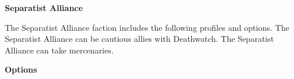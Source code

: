 \documentclass{article}
\begin{document}
{\Huge \textbf{Separatist Alliance}}
\vspace{0.6cm}

\begin{minipage}{19cm}
    The Separatist Alliance faction includes the following profiles and options.
    The Separatist Alliance can be cautious allies with Deathwatch.
    The Separatist Alliance can take mercenaries.
\end{minipage}

\vspace{0.3cm}
{\scriptsize

\setlength\extrarowheight{1.5pt}


}
\vspace{0.6cm}

{\Large \textbf{Options}}
\begin{multicols}{2}

{\scriptsize

\setlength\extrarowheight{1.5pt}


\vspace{0.6cm}

\setlength\extrarowheight{1.5pt}


\vspace{0.6cm}

\setlength\extrarowheight{1.5pt}


\vspace{0.6cm}
\setlength\extrarowheight{1.5pt}


\vspace{0.6cm}
\setlength\extrarowheight{1.5pt}


\vspace{0.6cm}
\setlength\extrarowheight{1.5pt}


\vspace{0.6cm}
\setlength\extrarowheight{1.5pt}


\vspace{0.6cm}

\setlength\extrarowheight{1.5pt}


\vspace{0.6cm}
\setlength\extrarowheight{1.5pt}


}
\end{multicols}
\end{document}
